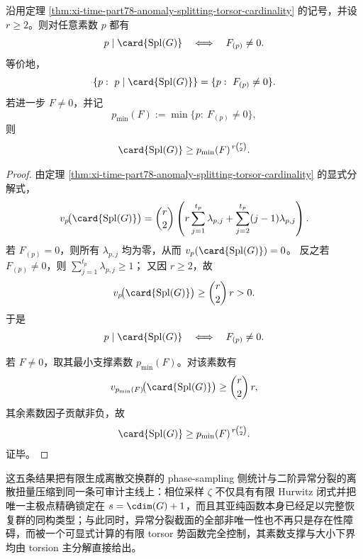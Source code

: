 \begin{corollary}\label{cor:xi-time-part78-anomaly-splitting-prime-support-lower-bound}
沿用定理 \ref{thm:xi-time-part78-anomaly-splitting-torsor-cardinality} 的记号，并设 \(r\ge 2\)。则对任意素数 \(p\) 都有
\[
p\mid \card{\mathrm{Spl}(G)}
\quad\Longleftrightarrow\quad
F_{(p)}\neq 0.
\]
等价地，
\[
\{p:\ p\mid \card{\mathrm{Spl}(G)}\}
=
\{p:\ F_{(p)}\neq 0\}.
\]
若进一步 \(F\neq 0\)，并记
\[
p_{\min}(F):=\min\{p:\ F_{(p)}\neq 0\},
\]
则
\[
\card{\mathrm{Spl}(G)}
\ge p_{\min}(F)^{\,r\binom r2}.
\]
\end{corollary}
\begin{proof}
由定理 \ref{thm:xi-time-part78-anomaly-splitting-torsor-cardinality} 的显式分解式，
\[
v_p\!\bigl(\card{\mathrm{Spl}(G)}\bigr)
=\binom r2\left(
r\sum_{j=1}^{t_p}\lambda_{p,j}
+\sum_{j=2}^{t_p}(j-1)\lambda_{p,j}
\right).
\]
若 \(F_{(p)}=0\)，则所有 \(\lambda_{p,j}\) 均为零，从而
\(
v_p(\card{\mathrm{Spl}(G)})=0
\)。
反之若 \(F_{(p)}\neq 0\)，则
\(
\sum_{j=1}^{t_p}\lambda_{p,j}\ge 1
\)；
又因 \(r\ge 2\)，故
\[
v_p\!\bigl(\card{\mathrm{Spl}(G)}\bigr)
\ge \binom r2\,r>0.
\]
于是
\[
p\mid \card{\mathrm{Spl}(G)}
\quad\Longleftrightarrow\quad
F_{(p)}\neq 0.
\]

若 \(F\neq 0\)，取其最小支撑素数 \(p_{\min}(F)\)。对该素数有
\[
v_{p_{\min}(F)}\!\bigl(\card{\mathrm{Spl}(G)}\bigr)\ge \binom r2\,r,
\]
其余素数因子贡献非负，故
\[
\card{\mathrm{Spl}(G)}
\ge p_{\min}(F)^{\,r\binom r2}.
\]
证毕。
\end{proof}

\noindent
这五条结果把有限生成离散交换群的 phase-sampling 侧统计与二阶异常分裂的离散扭量压缩到同一条可审计主线上：相位采样 \(\zeta\) 不仅具有有限 Hurwitz 闭式并把唯一主极点精确锁定在 \(s=\cdim(G)+1\)，而且其亚纯函数本身已经足以完整恢复群的同构类型；与此同时，异常分裂截面的全部非唯一性也不再只是存在性障碍，而被一个可显式计算的有限 torsor 势函数完全控制，其素数支撑与大小下界均由 torsion 主分解直接给出。



\endinput
